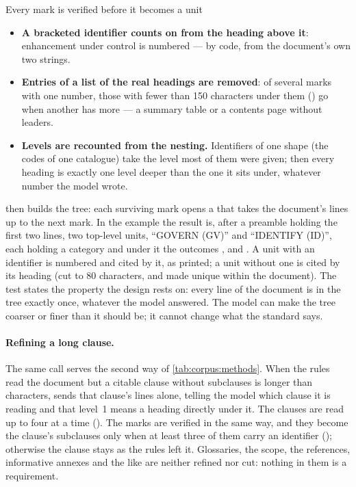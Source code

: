 \begin{codebox}{Every mark is verified before it becomes a unit}
\begin{itemize}
    mark is dropped. A short name before a colon is split: the name is the heading, the rest
    the first line of the text.
  \item \textbf{A bracketed identifier counts on from the heading above it}: enhancement
     under control  is numbered  --- by code, from the
    document's own two strings.
  \item \textbf{Entries of a list of the real headings are removed}: of several marks with one
    number, those with fewer than 150 characters under them () go when
    another has more --- a summary table or a contents page without leaders.
  \item \textbf{Levels are recounted from the nesting.} Identifiers of one shape (the codes of
    one catalogue) take the level most of them were given; then every heading is exactly one
    level deeper than the one it sits under, whatever number the model wrote.
\end{itemize}
\end{codebox}

 then builds the tree: each surviving mark opens a  that takes the
document's lines up to the next mark. In the example the result is, after a preamble holding
the first two lines, two top-level units,
\enquote{GOVERN (GV)} and \enquote{IDENTIFY (ID)}, each holding a category and under it the
outcomes ,  and . A unit with an identifier is
numbered and cited by it, as printed; a unit without one is cited by its heading (cut to 80
characters, and made unique within the document). The test
 states the property the design
rests on: every line of the document is in the tree exactly once, whatever the model
answered. The model can make the tree coarser or finer than it should be; it cannot change
what the standard says.

\paragraph{Refining a long clause.} The same call serves the second way of
\cref{tab:corpus:methods}. When the rules read the document but a citable clause without
subclauses is longer than  characters,  sends
that clause's lines alone, telling the model which clause it is reading and that level~1
means a heading directly under it. The clauses are read up to four at a time
(). The marks are verified in the same way, and they become the clause's
subclauses only when at least three of them carry an identifier ();
otherwise the clause stays as the rules left it. Glossaries, the scope, the references,
informative annexes and the like are neither refined nor cut: nothing in them is a
requirement.

